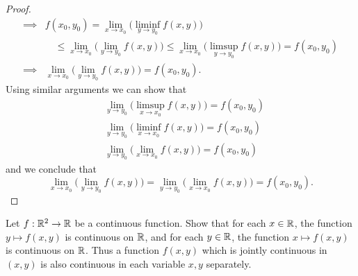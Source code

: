 \begin{proof}
\begin{align*}
    \implies & f(x_0, y_0) = \lim_{x \to x_0} \big(\liminf_{y \to y_0} f(x, y)\big)                                                                     \\
             & \quad \leq \lim_{x \to x_0} \big(\lim_{y \to y_0} f(x, y)\big) \leq \lim_{x \to x_0} \big(\limsup_{y \to y_0} f(x, y)\big) = f(x_0, y_0) \\
    \implies & \lim_{x \to x_0} \big(\lim_{y \to y_0} f(x, y)\big) = f(x_0, y_0).
  \end{align*}
  Using similar arguments we can show that
  \begin{align*}
     & \lim_{y \to y_0} \big(\limsup_{x \to x_0} f(x, y)\big) = f(x_0, y_0) \\
     & \lim_{y \to y_0} \big(\liminf_{x \to x_0} f(x, y)\big) = f(x_0, y_0) \\
     & \lim_{y \to y_0} \big(\lim_{x \to x_0} f(x, y)\big) = f(x_0, y_0)
  \end{align*}
  and we conclude that
  \[
    \lim_{x \to x_0} \big(\lim_{y \to y_0} f(x, y)\big) = \lim_{y \to y_0} \big(\lim_{x \to x_0} f(x, y)\big) = f(x_0, y_0).
  \]
\end{proof}

\begin{ex}\label{ex:2.2.10}
  Let \(f : \mathbb{R}^2 \to \mathbb{R}\) be a continuous function.
  Show that for each \(x \in \mathbb{R}\), the function \(y \mapsto f(x, y)\) is continuous on \(\mathbb{R}\), and for each \(y \in \mathbb{R}\), the function \(x \mapsto f(x, y)\) is continuous on \(\mathbb{R}\).
  Thus a function \(f(x, y)\) which is jointly continuous in \((x, y)\) is also continuous in each variable \(x, y\) separately.
\end{ex}

